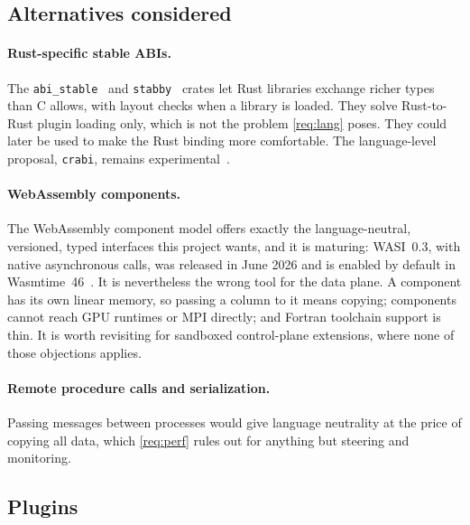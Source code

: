 \documentclass[11pt,a4paper]{article}
\newcommand{\code}[1]{\texttt{#1}}
\begin{document}
\subsection{Alternatives considered}

\paragraph{Rust-specific stable ABIs.}  The \code{abi\_stable}~\cite{abistable}
and \code{stabby}~\cite{stabby} crates let Rust libraries exchange richer
types than C allows, with layout checks when a library is loaded.  They solve
Rust-to-Rust plugin loading only, which is not the problem \ref{req:lang}
poses.  They could later be used to make the Rust binding more comfortable.
The language-level proposal, \code{crabi}, remains experimental~\cite{crabi}.

\paragraph{WebAssembly components.}  The WebAssembly component model offers
exactly the language-neutral, versioned, typed interfaces this project wants,
and it is maturing: WASI~0.3, with native asynchronous calls, was released in
June 2026 and is enabled by default in Wasmtime~46~\cite{wasi03}.  It is
nevertheless the wrong tool for the data plane.  A component has its own
linear memory, so passing a column to it means copying; components cannot
reach GPU runtimes or MPI directly; and Fortran toolchain support is thin.  It
is worth revisiting for sandboxed control-plane extensions, where none of
those objections applies.

\paragraph{Remote procedure calls and serialization.}  Passing messages
between processes would give language neutrality at the price of copying all
data, which \ref{req:perf} rules out for anything but steering and
monitoring.

\subsection{Plugins}
\end{document}

